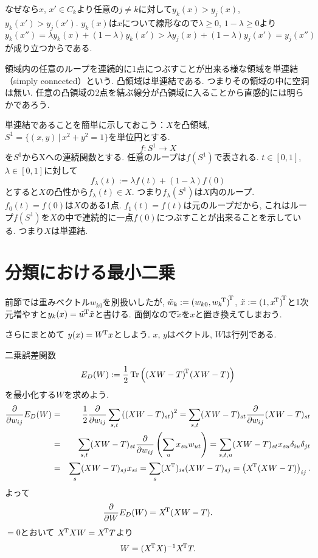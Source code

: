 なぜなら$x$, $x' \in C_k$より任意の$j\neq k$に対して$y_k(x) > y_j(x)$, $y_k(x') > y_j(x')$.
$y_k(x)$は$x$について線形なので$\lambda \geq 0$, $1-\lambda \geq 0$より
$$
y_k(x'') = \lambda y_k(x) + (1-\lambda) y_k(x') > \lambda y_j(x) + (1-\lambda) y_j(x') = y_j(x'')
$$
が成り立つからである.

領域内の任意のループを連続的に1点につぶすことが出来る様な領域を単連結（simply connected）という.
凸領域は単連結である. つまりその領域の中に空洞は無い. 任意の凸領域の2点を結ぶ線分が凸領域に入ることから直感的には明らかであろう.

単連結であることを簡単に示しておこう：$X$を凸領域, $S^1=\{(x,y)\,|\,x^2+y^2=1\}$を単位円とする.
$$
f:S^1 \rightarrow X
$$
を$S^1$からXへの連続関数とする. 任意のループは$f(S^1)$で表される.
$t \in [0, 1]$, $\lambda \in [0, 1]$に対して
$$
f_\lambda(t) := \lambda f(t) + (1-\lambda)f(0)
$$
とすると$X$の凸性から$f_\lambda(t) \in X$.
つまり$f_\lambda(S^1)$は$X$内のループ.
$f_0(t)=f(0)$は$X$のある1点. $f_1(t)=f(t)$は元のループだから, これはループ$f(S^1)$を$X$の中で連続的に一点$f(0)$につぶすことが出来ることを示している. つまり$X$は単連結.

\section{分類における最小二乗}
前節では重みベクトル$w_{k0}$を別扱いしたが, $\tilde{w}_k:={(w_{k0}, {w_k}^{\!\mathrm{T}})}^{\!\mathrm{T}}$,
$\tilde{x}:={(1,{x}^{\!\mathrm{T}})}^{\!\mathrm{T}}$と1次元増やすと$y_k(x)={\tilde{w}}^{\!\mathrm{T}}\tilde{x}$と書ける.
面倒なので$\tilde{x}$を$x$と置き換えてしまおう.

さらにまとめて
$y(x)={W}^{\!\mathrm{T}}x$としよう. $x$, $y$はベクトル, $W$は行列である.

二乗誤差関数
$$
E_D(W):=\frac{1}{2}\mathop{\mathrm{Tr}}\nolimits\left({(XW-T)}^{\!\mathrm{T}}(XW-T)\right)
$$
を最小化する$W$を求めよう.
\begin{eqnarray*}
\frac{\partial}{\partial w_{ij}}E_D(W)
 &=& \frac{1}{2}\frac{\partial}{\partial w_{ij}}\sum_{s,t} \left((XW-T)_{st}\right)^2
 = \sum_{s,t} (XW-T)_{st} \frac{\partial}{\partial w_{ij}}(XW-T)_{st}\\
 &=& \sum_{s,t} (XW-T)_{st} \frac{\partial}{\partial w_{ij}}\left(\sum_u x_{su}w_{ut}\right)
 = \sum_{s,t,u} (XW-T)_{st} x_{su}\delta_{iu}\delta_{jt}\\
 &=& \sum_s (XW-T)_{sj} x_{si}
 = \sum_s ({X}^{\!\mathrm{T}})_{is} (XW-T)_{sj}
 = \left({X}^{\!\mathrm{T}}(XW-T)\right)_{ij}.
\end{eqnarray*}
よって
$$
\frac{\partial}{\partial W}E_D(W)={X}^{\!\mathrm{T}}(XW-T).
$$
$=0$とおいて
${X}^{\!\mathrm{T}}XW = {X}^{\!\mathrm{T}}T$より
$$
W=({X}^{\!\mathrm{T}}X)^{-1}{X}^{\!\mathrm{T}}T.
$$
\vspace{0pt}

